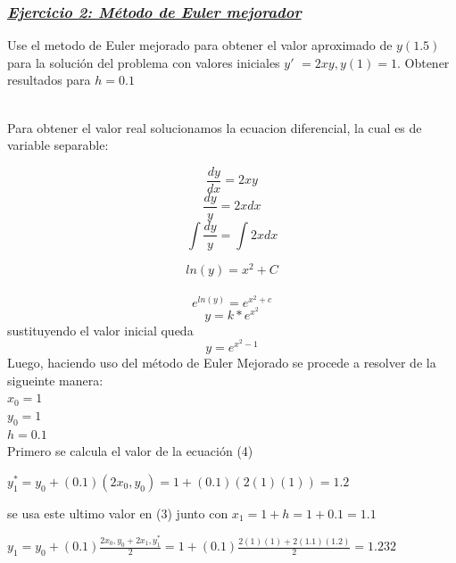 \documentclass[12 pt,letterpaper]{article}
\begin{document}
\begin{itemize}
\flushleft\subsubsection{\underline{\textit{Ejercicio 2: Método de Euler mejorador}}}\vspace{0.5cm}
\begin{flushleft}
\item\justify
Use el metodo de Euler mejorado para obtener el valor aproximado de $y(1.5)$ para la solución del problema con valores iniciales $ y'$ $= 2xy,  y(1) = 1$. Obtener resultados para $h = 0.1 $
\item{}\\
Para obtener el valor real solucionamos la ecuacion diferencial, la cual es de variable separable:
\end{flushleft}
\begin{flushleft}
  \begin{equation}
    \frac{dy}{dx}=2xy
    \end{equation}
\begin{equation}
    \frac{dy}{y}=2x dx
    \end{equation}
\begin{equation}
\int{\frac{dy}{y}=\int{2x dx}}
\end{equation}

\[ln(y) = x^{2}+ C\]\\
\[e^{ln(y)} = e^{x^{2}+c}\]
\[y = k*e^{x^2}\]
sustituyendo el valor inicial queda\\
\[y = e^{x^2-1}\]
Luego, haciendo uso del método de Euler Mejorado se procede a resolver de la sigueinte manera:\\
$x_{0}=1$\\
$y_{0}=1$\\
$h=0.1$\\
Primero se calcula el valor de la ecuación (4)
\vspace{0.5mm} %
\begin{flushleft}
 \begin{center}
   $y^*_{1}=y_{0}+(0.1)(2x_{0},y_{0})=1+(0.1)(2(1)(1))=1.2$
    \end{center}
\end{flushleft}\vspace{0.1Cm}
se usa este ultimo valor en (3) junto con $ x_{1}=1+h=1+0.1=1.1$
\begin{flushleft}
$y_{1}=y_{0}+(0.1) \frac{2x_{0},y_{0}+2x_{1},y^*_{1}}{2}=1+(0.1) \frac{2(1)(1)+2(1.1)(1.2)}{2}=1.232$
\end{flushleft}


\end{flushleft}
\end{itemize}
\end{document}
